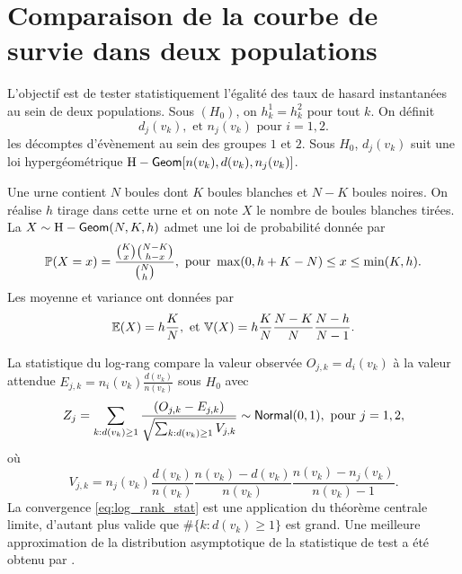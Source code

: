 \section{Comparaison de la courbe de survie dans deux populations}
L'objectif est de tester statistiquement l'égalité des taux de hasard instantanées au sein de deux populations. Sous $(H_0)$, on $h_k^1 =h_k^2$ pour tout $k$. On définit 
$$
d_j(v_k),\text{ et } n_j(v_k)\text{ pour }i=1,2. 
$$
les décomptes d'évènement au sein des groupes $1$ et $2$. Sous $H_0$, $d_j(v_k)$ suit une loi hypergéométrique $\text{H}-\mathsf{Geom}[n(v_k), d(v_k), n_j(v_k)]$.
\begin{definition}
Une urne contient $N$ boules dont $K$ boules blanches et $N-K$ boules noires. On réalise $h$ tirage dans cette urne et on note $X$ le nombre de boules blanches tirées. La \va $X\sim \text{H}-\mathsf{Geom}(N, K, h)$ admet une loi de probabilité donnée par
$$
\mathbb{P}(X = x)=\frac{\binom{K}{x}\binom{N-K}{h-x}}{\binom{N}{h}},\text{ pour }\max(0, h+K-N)\leq x\leq\min(K,h).
$$ 
Les moyenne et variance ont données par 
$$
\mathbb{E}(X) =h\frac{K}{N},\text{ et }\mathbb{V}(X) = h\frac{K}{N}\frac{N-K}{N}\frac{N-h}{N-1}.
$$
\end{definition}
La statistique du log-rang compare la valeur observée $O_{j,k} = d_i(v_k)$ à la valeur attendue $E_{j,k} = n_i(v_k)\frac{d(v_k)}{n(v_k)}$ sous $H_0$ avec 
\begin{equation}\label{eq:log_rank_stat}
Z_j=\sum_{k: d(v_k)\geq 1}\frac{(O_{j,k} - E_{j,k})}{\sqrt{\sum_{k: d(v_k)\geq 1}V_{j,k}}}\sim \mathsf{Normal}(0,1),\text{ pour }j = 1,2,
\end{equation}
où
$$
V_{j,k}=n_j(v_k)\frac{d(v_k)}{n(v_k)}\frac{n(v_k)-d(v_k)}{n(v_k)}\frac{n(v_k)-n_j(v_k)}{n(v_k)-1}.
$$
La convergence \eqref{eq:log_rank_stat} est une application du théorème centrale limite, d'autant plus valide que $\#\{k: d(v_k)\geq 1\}$ est grand. Une meilleure approximation de la distribution asymptotique de la statistique de test a été obtenu par \citet{Peto1972}.
